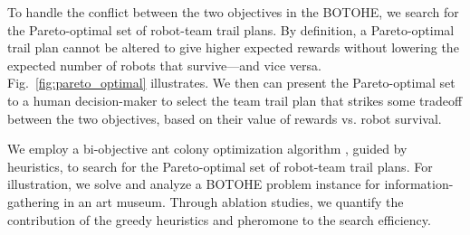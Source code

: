 \documentclass[11pt, oneside]{article}
\begin{document}
To handle the conflict between the two objectives in the BOTOHE, we search for the Pareto-optimal set \cite{pardalos2017non,branke2008multiobjective} of robot-team trail plans. By definition, a Pareto-optimal trail plan cannot be altered to give higher expected rewards without lowering the expected number of robots that survive---and vice versa. 
Fig.~\ref{fig:pareto_optimal} illustrates.
We then can present the Pareto-optimal set to a human decision-maker to select the team trail plan that strikes some tradeoff between the two objectives, based on their value of rewards vs. robot survival. 

We employ a bi-objective ant colony optimization algorithm \cite{iredi2001bi}, guided by heuristics, to search for the Pareto-optimal set of robot-team trail plans.
For illustration, we solve and analyze a BOTOHE problem instance for information-gathering in an art museum.
Through ablation studies, we quantify the contribution of the greedy heuristics and pheromone to the search efficiency. 
\end{document}
